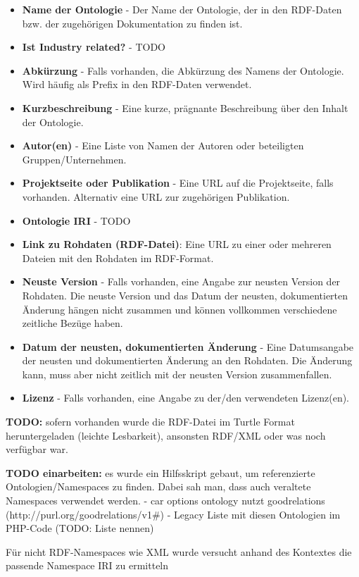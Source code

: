 \documentclass{article}
\begin{document}
\begin{itemize}
    \item \textbf{Name der Ontologie} - Der Name der Ontologie, der in den RDF-Daten bzw. der zugehörigen Dokumentation zu finden ist.
    \item \textbf{Ist Industry related?} - TODO
    \item \textbf{Abkürzung} - Falls vorhanden, die Abkürzung des Namens der Ontologie. Wird häufig als Prefix in den RDF-Daten verwendet.
    \item \textbf{Kurzbeschreibung} - Eine kurze, prägnante Beschreibung über den Inhalt der Ontologie.
    \item \textbf{Autor(en)} - Eine Liste von Namen der Autoren oder beteiligten Gruppen/Unternehmen.
    \item \textbf{Projektseite oder Publikation} - Eine URL auf die Projektseite, falls vorhanden. Alternativ eine URL zur zugehörigen Publikation.
    \item \textbf{Ontologie IRI} - TODO
    \item \textbf{Link zu Rohdaten (RDF-Datei)}: Eine URL zu einer oder mehreren Dateien mit den Rohdaten im RDF-Format.
    \item \textbf{Neuste Version} - Falls vorhanden, eine Angabe zur neusten Version der Rohdaten. Die neuste Version und das Datum der neusten, dokumentierten Änderung hängen nicht zusammen und können vollkommen verschiedene zeitliche Bezüge haben.
    \item \textbf{Datum der neusten, dokumentierten Änderung} - Eine Datumsangabe der neusten und dokumentierten Änderung an den Rohdaten. Die Änderung kann, muss aber nicht zeitlich mit der neusten Version zusammenfallen.
    \item \textbf{Lizenz} - Falls vorhanden, eine Angabe zu der/den verwendeten Lizenz(en).
\end{itemize}

\textbf{TODO:} sofern vorhanden wurde die RDF-Datei im Turtle Format heruntergeladen (leichte Lesbarkeit), ansonsten RDF/XML oder was noch verfügbar war.

\textbf{TODO einarbeiten:} es wurde ein Hilfsskript gebaut, um referenzierte Ontologien/Namespaces zu finden. Dabei sah man, dass auch veraltete Namespaces verwendet werden.
- car options ontology nutzt goodrelations (http://purl.org/goodrelations/v1\#) - Legacy Liste mit diesen Ontologien im PHP-Code (TODO: Liste nennen)

Für nicht RDF-Namespaces wie XML wurde versucht anhand des Kontextes die passende Namespace IRI zu ermitteln
\end{document}
